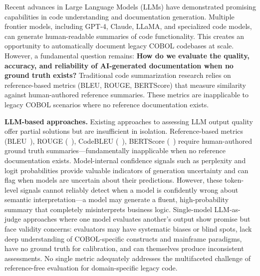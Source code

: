 Recent advances in Large Language Models (LLMs) have demonstrated promising capabilities in code understanding and documentation generation. Multiple frontier models, including GPT-4, Claude, LLaMA, and specialized code models, can generate human-readable summaries of code functionality. This creates an opportunity to automatically document legacy COBOL codebases at scale. However, a fundamental question remains: \textbf{How do we evaluate the quality, accuracy, and reliability of AI-generated documentation when no ground truth exists?} Traditional code summarization research relies on reference-based metrics (BLEU, ROUGE, BERTScore) that measure similarity against human-authored reference summaries. These metrics are inapplicable to legacy COBOL scenarios where no reference documentation exists. %

\medskip
\noindent\textbf{LLM-based approaches.} Existing approaches to assessing LLM output quality offer partial solutions but are insufficient in isolation. Reference-based metrics (BLEU~\cite{papineni2002bleu}), ROUGE (~\cite{lin2004rouge}), CodeBLEU (~\cite{ren2020codebleu}), BERTScore (~\cite{zhang2019bertscore}) require human-authored ground truth summaries---fundamentally inapplicable when no reference documentation exists. Model-internal confidence signals such as perplexity and logit probabilities provide valuable indicators of generation uncertainty and can flag when models are uncertain about their predictions. However, these token-level signals cannot reliably detect when a model is confidently wrong about semantic interpretation---a model may generate a fluent, high-probability summary that completely misinterprets business logic. Single-model LLM-as-judge approaches where one model evaluates another's output show promise but face validity concerns: evaluators may have systematic biases or blind spots, lack deep understanding of COBOL-specific constructs and mainframe paradigms, have no ground truth for calibration, and can themselves produce inconsistent assessments. No single metric adequately addresses the multifaceted challenge of reference-free evaluation for domain-specific legacy code.

